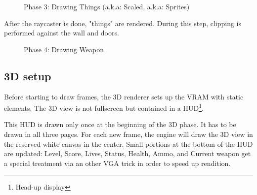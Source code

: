  
 
 \begin{figure}[H]
\centering
 \caption{Phase 3: Drawing Things (a.k.a: Scaled, a.k.a: Sprites)} 
 \end{figure}
 After the raycaster is done, "things" are rendered. During this step, clipping is performed against the wall and doors.




 \begin{figure}[H]
\centering
 \caption{Phase 4: Drawing Weapon} 
 \end{figure}
 













\subsection{3D setup}
Before starting to draw frames, the 3D renderer sets up the VRAM with static elements. The 3D view is not fullscreen but contained in a HUD\footnote{Head-up display}.
\begin{figure}[H]
  \centering
\end{figure}
This HUD is drawn only once at the beginning of the 3D phase. It has to be drawn in all three pages. For each new frame, the engine will draw the 3D view in the reserved white canvas in the center. Small portions at the bottom of the HUD are updated: Level, Score, Lives, Status, Health, Ammo, and Current weapon get a special treatment via an other VGA trick in order to speed up rendition.\\
\par

